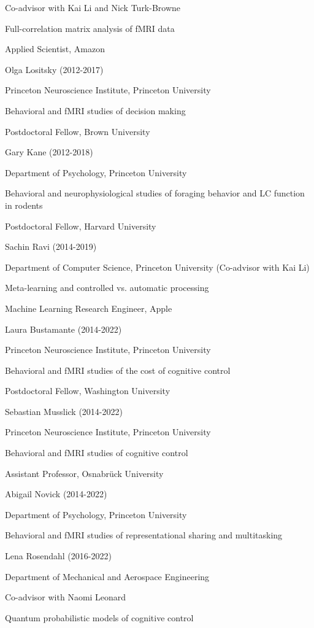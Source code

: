 \documentclass[10 pt]{article}
\begin{document}
Co-advisor with Kai Li and Nick Turk-Browne

Full-correlation matrix analysis of fMRI data

Applied Scientist, Amazon
    \medskip

Olga Lositsky (2012-2017)

Princeton Neuroscience Institute, Princeton University

Behavioral and fMRI studies of decision making

Postdoctoral Fellow, Brown University
    \medskip

Gary Kane (2012-2018)

Department of Psychology, Princeton University

Behavioral and neurophysiological studies of foraging behavior and LC function in rodents

Postdoctoral Fellow, Harvard University
    \medskip

Sachin Ravi (2014-2019)

Department of Computer Science, Princeton University (Co-advisor with Kai Li)

Meta-learning and controlled vs. automatic processing

Machine Learning Research Engineer, Apple
    \medskip

Laura Bustamante (2014-2022)

Princeton Neuroscience Institute, Princeton University

Behavioral and fMRI studies of the cost of cognitive control

Postdoctoral Fellow, Washington University
    \medskip

Sebastian Musslick (2014-2022)

Princeton Neuroscience Institute, Princeton University

Behavioral and fMRI studies of cognitive control

Assistant Professor, Osnabrück University
    \medskip

Abigail Novick (2014-2022)

Department of Psychology, Princeton University

Behavioral and fMRI studies of representational sharing and multitasking
    \medskip

Lena Rosendahl (2016-2022)

Department of Mechanical and Aerospace Engineering

Co-advisor with Naomi Leonard

Quantum probabilistic models of cognitive control
\end{document}
